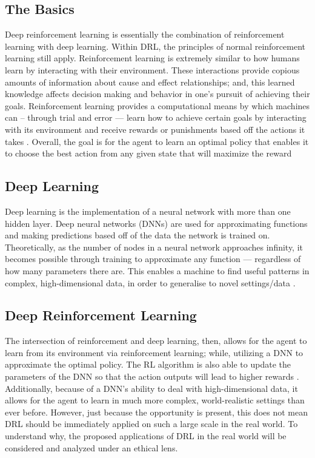\documentclass[10pt,twocolumn]{article}
\begin{document}
\subsection{The Basics}
Deep reinforcement learning is essentially the combination of reinforcement learning with deep learning. Within DRL, the principles of normal reinforcement learning still apply. Reinforcement learning is extremely similar to how humans learn by interacting with their environment. These interactions provide copious amounts of information about cause and effect relationships; and, this learned knowledge affects decision making and behavior in one's pursuit of achieving their goals. Reinforcement learning provides a computational means by which machines can – through trial and error — learn how to achieve certain goals by interacting with its environment and receive rewards or punishments based off the actions it takes \cite{Sutton1998}. Overall, the goal is for the agent to learn an optimal policy that enables it to choose the best action from any given state that will maximize the reward \cite{10.1613/jair.1.12360}

\subsection{Deep Learning}
Deep learning is the implementation of a neural network with more than one hidden layer. Deep neural networks (DNNs) are used for approximating functions and making predictions based off of the data the network is trained on. Theoretically, as the number of nodes in a neural network approaches infinity, it becomes possible through training to approximate any function — regardless of how many parameters there are. This enables a machine to find useful patterns in complex, high-dimensional data, in order to generalise to novel settings/data \cite{10.1613/jair.1.12360}.

\subsection{Deep Reinforcement Learning}
The intersection of reinforcement and deep learning, then, allows for the agent to learn from its environment via reinforcement learning; while, utilizing a DNN to approximate the optimal policy. The RL algorithm is also able to update the parameters of the DNN so that the action outputs will lead to higher rewards \cite{10.1613/jair.1.12360}. Additionally, because of a DNN's ability to deal with high-dimensional data, it allows for the agent to learn in much more complex, world-realistic settings than ever before. However, just because the opportunity is present, this does not mean DRL should be immediately applied on such a large scale in the real world. To understand why, the proposed applications of DRL in the real world will be considered and analyzed under an ethical lens. 
\end{document}
